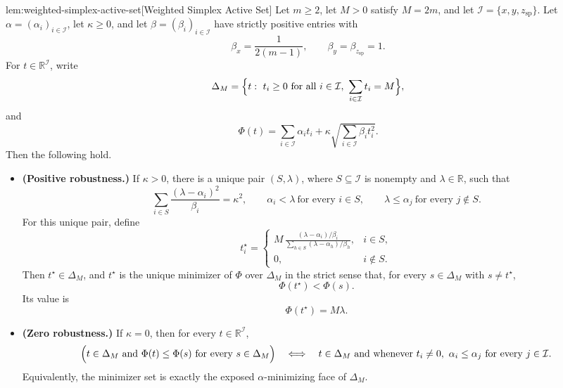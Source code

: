 \begin{lemmav}{lem:weighted-simplex-active-set}[Weighted Simplex Active Set]
Let \(m\ge 2\), let \(M>0\) satisfy \(M=2m\), and let
\(\mathcal I=\{x,y,z_{\mathrm{sp}}\}\). Let
\(\alpha=(\alpha_i)_{i\in\mathcal I}\), let \(\kappa\ge 0\), and let
\(\beta=(\beta_i)_{i\in\mathcal I}\) have strictly positive entries with
\[
  \beta_x=\frac{1}{2(m-1)},\qquad
  \beta_y=\beta_{z_{\mathrm{sp}}}=1 .
\]
For \(t\in\mathbb R^{\mathcal I}\), write
\[
  \Delta_M=\Bigl\{t:\ t_i\ge 0\ \text{for all }i\in\mathcal I,\ 
  \sum_{i\in\mathcal I}t_i=M\Bigr\},
\]
and
\[
  \Phi(t)=\sum_{i\in\mathcal I}\alpha_i t_i
  +\kappa\sqrt{\sum_{i\in\mathcal I}\beta_i t_i^2}.
\]
Then the following hold.
\begin{itemize}
\item \textbf{(Positive robustness.)} If \(\kappa>0\), there is a unique pair
\((S,\lambda)\), where \(S\subseteq\mathcal I\) is nonempty and
\(\lambda\in\mathbb R\), such that
\[
  \sum_{i\in S}\frac{(\lambda-\alpha_i)^2}{\beta_i}=\kappa^2,\qquad
  \alpha_i<\lambda\ \text{for every }i\in S,\qquad
  \lambda\le \alpha_j\ \text{for every }j\notin S .
\]
For this unique pair, define
\[
  t_i^\star=
  \begin{cases}
  \displaystyle
  M\,\frac{(\lambda-\alpha_i)/\beta_i}
  {\sum_{h\in S}(\lambda-\alpha_h)/\beta_h}, & i\in S,\\[1.1em]
  0, & i\notin S .
  \end{cases}
\]
Then \(t^\star\in\Delta_M\), and \(t^\star\) is the unique minimizer of
\(\Phi\) over \(\Delta_M\) in the strict sense that, for every
\(s\in\Delta_M\) with \(s\ne t^\star\),
\[
  \Phi(t^\star)<\Phi(s).
\]
Its value is
\[
  \Phi(t^\star)=M\lambda .
\]

\item \textbf{(Zero robustness.)} If \(\kappa=0\), then for every
\(t\in\mathbb R^{\mathcal I}\),
\[
  \Bigl(t\in\Delta_M\ \text{and}\ 
  \Phi(t)\le \Phi(s)\ \text{for every }s\in\Delta_M\Bigr)
  \quad\Longleftrightarrow\quad
  t\in\Delta_M\ \text{and whenever }t_i\ne 0,\ 
  \alpha_i\le \alpha_j\ \text{for every }j\in\mathcal I .
\]
Equivalently, the minimizer set is exactly the exposed
\(\alpha\)-minimizing face of \(\Delta_M\).
\end{itemize}
\end{lemmav}


